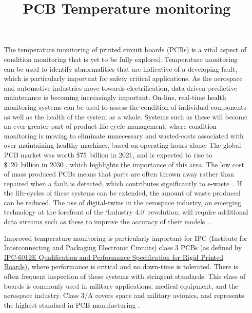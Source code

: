 

\title{PCB Temperature monitoring}



\onehalfspacing 



The temperature monitoring of printed circuit boards (PCBs) is a vital aspect of condition monitoring that is yet to be fully explored. Temperature monitoring can be used to identify abnormalities that are indicative of a developing fault, which is particularly important for safety critical applications. As the aerospace and automotive industries move towards electrification, data-driven predictive maintenance is becoming increasingly important. On-line, real-time health monitoring systems can be used to assess the condition of individual components as well as the health of the system as a whole. Systems such as these will become an ever greater part of product life-cycle management, where condition monitoring is moving to eliminate unnecessary and wasted-costs associated with over maintaining healthy machines, based on operating hours alone. The global PCB market was worth \$75~billion in 2021, and is expected to rise to \$120~billion in 2030 \cite{Insights2022}, which highlights the importance of this area. The low cost of mass produced PCBs means that parts are often thrown away rather than repaired when a fault is detected, which contributes significantly to e-waste~\cite{Canal_Marques_2013}. If the life-cycles of these systems can be extended, the amount of waste produced can be reduced. The use of digital-twins in the aerospace industry, an emerging technology at the forefront of the `Industry 4.0' revolution, will require additional data streams such as these to improve the accuracy of their models~\cite{Liu2022}.

Improved temperature monitoring is particularly important for IPC (Institute for Interconnecting and Packaging Electronic Circuits) class 3 PCBs (as defined by \href{https://shop.ipc.org/automotive-general-electronics-medical-space-and-defense/standards/6012-0-e-english}{IPC-6012E Qualification and Performance Specification for Rigid Printed Boards}), where performance is critical and no down-time is tolerated. There is often frequent inspection of these systems with stringent standards. This class of boards is commonly used in military applications, medical equipment, and the aerospace industry. Class 3/A covers space and military avionics, and represents the highest standard in PCB manufacturing \cite{IIPEC2020}.

